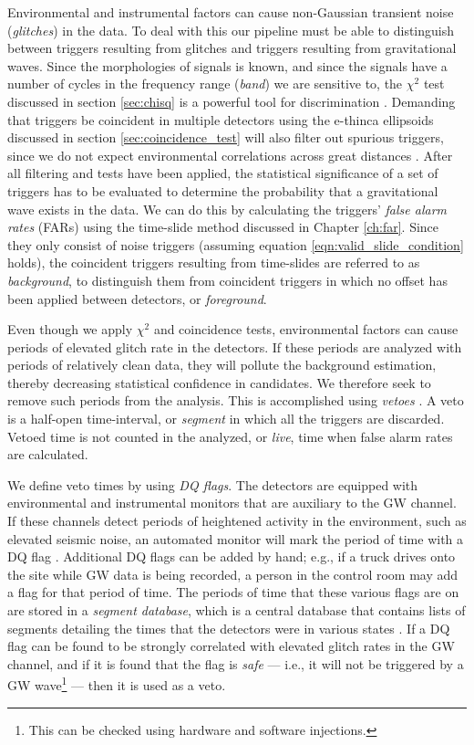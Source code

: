 Environmental and instrumental factors can cause non-Gaussian transient noise
(\emph{glitches}) in the data. To deal with this our pipeline must be able to
distinguish between triggers resulting from glitches and triggers resulting
from gravitational waves. Since the morphologies of signals is known, and since
 the signals have a number of cycles in the frequency range (\emph{band}) we
are sensitive to, the $\chi^2$ test discussed in section \ref{sec:chisq} is a
powerful tool for discrimination \cite{Allen:2004}. Demanding that triggers be
coincident in multiple detectors using the e-thinca ellipsoids discussed in
section \ref{sec:coincidence_test} will also filter out spurious triggers,
since we do not expect environmental correlations across great distances
\cite{Robinson:2008}. After all filtering and tests have been applied, the
statistical significance of a set of triggers has to be evaluated to determine
the probability that a gravitational wave exists in the data. We can do this by
calculating the triggers' \emph{false alarm rates} (FARs) using the time-slide
method discussed in Chapter \ref{ch:far}. Since they only consist of noise
triggers (assuming equation \ref{eqn:valid_slide_condition} holds), the
coincident triggers resulting from time-slides are referred to as
\emph{background}, to distinguish them from coincident triggers in which no
offset has been applied between detectors, or \emph{foreground}.

Even though we apply $\chi^2$ and coincidence tests, environmental factors can
cause periods of elevated glitch rate in the detectors. If these periods are
analyzed with periods of relatively clean data, they will pollute the
background estimation, thereby decreasing statistical confidence in candidates.
We therefore seek to remove such periods from the analysis. This is
accomplished using \emph{vetoes} \cite{Slutsky:2010ff, Christensen:2010}. A
veto is a half-open time-interval, or \emph{segment} in which all the triggers
are discarded. Vetoed time is not counted in the analyzed, or \emph{live}, time
when false alarm rates are calculated.

We define veto times by using \emph{\ac{DQ} flags}. The detectors are equipped
with environmental and instrumental monitors that are auxiliary to the \ac{GW}
channel. If these channels detect periods of heightened activity in the
environment, such as elevated seismic noise, an automated monitor will mark the
period of time with a \ac{DQ} flag \cite{glitchmon}. Additional \ac{DQ} flags
can be added by hand; e.g., if a truck drives onto the site while \ac{GW} data
is being recorded, a person in the control room may add a flag for that period
of time.  The periods of time that these various flags are on are stored in a
\emph{segment database}, which is a central database that contains lists of
segments detailing the times that the detectors were in various states
\cite{BPP:segdb}. If a \ac{DQ} flag can be found to be strongly
correlated with elevated glitch rates in the \ac{GW} channel, and if it is
found that the flag is \emph{safe} --- i.e., it will not be triggered by a
\ac{GW} wave\footnote{This can be checked using hardware and software
injections.} --- then it is used as a veto. 

